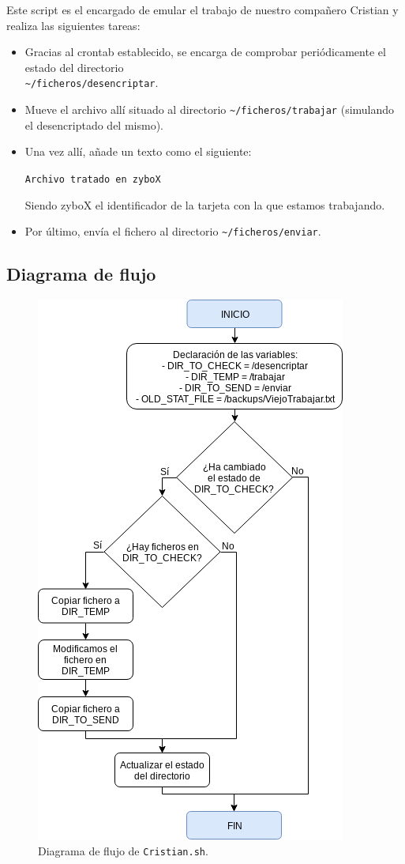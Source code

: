 Este script es el encargado de emular el trabajo de nuestro compañero Cristian y realiza las siguientes tareas:
\begin{itemize}
	\item Gracias al crontab establecido, se encarga de comprobar periódicamente el estado del directorio\\ \texttt{\textasciitilde/ficheros/desencriptar}.
	\item Mueve el archivo allí situado al directorio \texttt{\textasciitilde/ficheros/trabajar} (simulando el desencriptado del mismo).
	\item Una vez allí, añade un texto como el siguiente:
	\begin{center}
		\texttt{Archivo tratado en zyboX}
	\end{center}	
	Siendo zyboX el identificador de la tarjeta con la que estamos trabajando.
	\item Por último, envía el fichero al directorio \texttt{\textasciitilde/ficheros/enviar}.
\end{itemize}

\newpage
\subsection{Diagrama de flujo}
\begin{figure}[h]
	\centering
	\includegraphics[scale=0.7]{Anexos/Anexo3/Diagramas/Cristian.png}
	\caption{Diagrama de flujo de \texttt{Cristian.sh}.}
	\label{Diagrama de flujo de Cristian.sh}
\end{figure}

